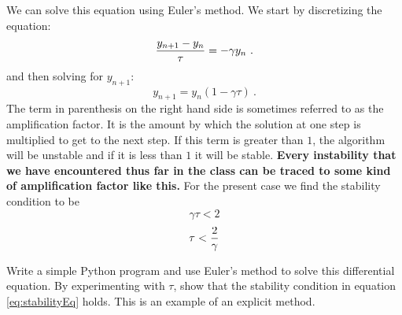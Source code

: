 \begin{enumerate}
\probtwo \label{P:18.1}

\begin{enumerate}
\subprob {}

    We can solve this equation using Euler's method.  We start by
    discretizing the equation:
    \begin{equation}
        {y_{n+1}-y_n \over \tau} = -\gamma y_n ~.
        \label{eq:Euler}
    \end{equation}
    and then solving for $y_{n+1}$:
    \begin{equation}
        y_{n+1} = y_n\left(1  -\gamma \tau\right) ~.
        \label{eq:EulerSol}
    \end{equation}
    The term in parenthesis on the right hand side is sometimes
    referred to as the amplification factor.  It is the amount by
    which the solution at one step is multiplied to get to the next
    step.  If this term is greater than $1$, the algorithm will be
    unstable and if it is less than $1$ it will be
    stable. \textbf{Every instability that we have encountered thus
      far in the class can be traced to some kind of amplification
      factor like this.} For the present case we find the stability
    condition to be
\[ \gamma \tau < 2\]
\begin{equation}
 \tau < {2 \over \gamma}\label{eq:stabilityEq}
\end{equation}

Write a simple Python program and use Euler's method to solve this
differential equation.  By experimenting with $\tau$, show that the
stability condition in equation \eqref{eq:stabilityEq} holds.  This
is an example of an explicit method.

\subprob \label{P:18.1b} 


\end{enumerate}
\end{enumerate}
